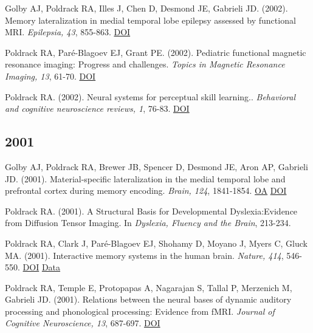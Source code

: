 \documentclass[10pt, letterpaper]{article}
\begin{document}
Golby AJ, Poldrack RA, Illes J, Chen D, Desmond JE, Gabrieli JD.  (2002). Memory lateralization in medial temporal lobe epilepsy assessed by functional MRI. \textit{Epilepsia, 43}, 855-863. \href{https://doi.org/10.1046/j.1528-1157.2002.20501.x}{DOI} \vspace{2mm}

Poldrack RA, Paré-Blagoev EJ, Grant PE.  (2002). Pediatric functional magnetic resonance imaging: Progress and challenges. \textit{Topics in Magnetic Resonance Imaging, 13}, 61-70. \href{https://doi.org/10.1097/00002142-200202000-00005}{DOI} \vspace{2mm}

Poldrack RA.  (2002). Neural systems for perceptual skill learning.. \textit{Behavioral and cognitive neuroscience reviews, 1}, 76-83. \href{https://doi.org/10.1177/1534582302001001005}{DOI} \vspace{2mm}

\subsection*{2001}Golby AJ, Poldrack RA, Brewer JB, Spencer D, Desmond JE, Aron AP, Gabrieli JD.  (2001). Material-specific lateralization in the medial temporal lobe and prefrontal cortex during memory encoding. \textit{Brain, 124}, 1841-1854. \href{https://doi.org/10.1093/brain/124.9.1841}{OA} \href{https://doi.org/10.1093/brain/124.9.1841}{DOI} \vspace{2mm}

Poldrack RA.  (2001). A Structural Basis for Developmental Dyslexia:Evidence from Diffusion Tensor Imaging. In \textit{Dyslexia, Fluency and the Brain}, 213-234. \vspace{2mm}

Poldrack RA, Clark J, Paré-Blagoev EJ, Shohamy D, Moyano J, Myers C, Gluck MA.  (2001). Interactive memory systems in the human brain. \textit{Nature, 414}, 546-550. \href{https://doi.org/10.1038/35107080}{DOI} \href{https://openneuro.org/datasets/ds000052/versions/00001}{Data} \vspace{2mm}

Poldrack RA, Temple E, Protopapas A, Nagarajan S, Tallal P, Merzenich M, Gabrieli JD.  (2001). Relations between the neural bases of dynamic auditory processing and phonological processing: Evidence from fMRI. \textit{Journal of Cognitive Neuroscience, 13}, 687-697. \href{https://doi.org/10.1162/089892901750363235}{DOI} \vspace{2mm}
\end{document}
